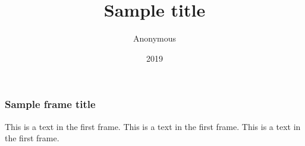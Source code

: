 \documentclass{beamer}
\title{Sample title}
\author{Anonymous}
\institute{Your institute}
\date{2019}
\begin{document}
 
	\frame{\titlepage}
 
	\begin{frame}
		\frametitle{Sample frame title}
		This is a text in the first frame. This is a text in the first frame. This is a text in the first frame.
	\end{frame}
	
\end{document}
